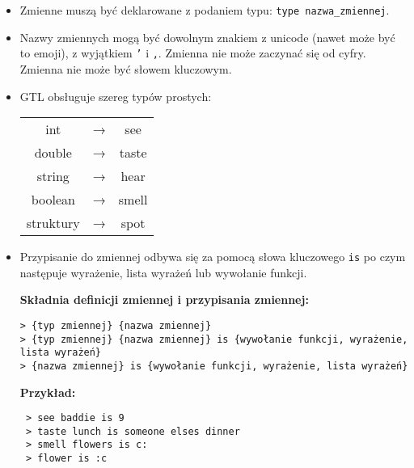 \documentclass{article}
\begin{document}
\begin{itemize}
    \item Zmienne muszą być deklarowane z podaniem typu: \texttt{type nazwa\_zmiennej}.
    \item Nazwy zmiennych mogą być dowolnym znakiem z unicode (nawet może być to emoji), z wyjątkiem \texttt{'} i \texttt{,}. Zmienna nie może zaczynać się od cyfry. Zmienna nie może być słowem kluczowym.
    \item GTL obsługuje szereg typów prostych:

    \begin{table}[H]
    \centering
    \begin{tabular}{ccc}
        int                   & → & see   \\
        double                & → & taste \\
        string                & → & hear  \\
        boolean               & → & smell \\
        struktury             & → & spot
    \end{tabular}
    \end{table}

        \item Przypisanie do zmiennej odbywa się za pomocą słowa kluczowego \texttt{is} po czym następuje wyrażenie, lista wyrażeń lub wywołanie funkcji.

\textbf{Składnia definicji zmiennej i przypisania zmiennej:}
{\color{green}
\begin{Verbatim}
> {typ zmiennej} {nazwa zmiennej}
> {typ zmiennej} {nazwa zmiennej} is {wywołanie funkcji, wyrażenie, lista wyrażeń}
> {nazwa zmiennej} is {wywołanie funkcji, wyrażenie, lista wyrażeń}
\end{Verbatim}
}

\newpage

\textbf{Przykład:}
{\color{green}
\begin{verbatim}
 > see baddie is 9
 > taste lunch is someone elses dinner
 > smell flowers is c:
 > flower is :c
\end{verbatim}
}


\end{itemize}
\end{document}
